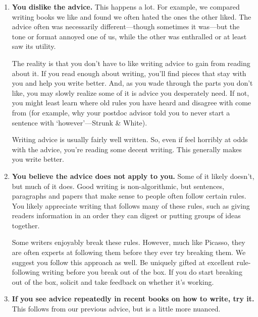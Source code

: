 \documentclass[11pt,letter]{article}
\begin{document}
\begin{enumerate}
\item {\bf You dislike the advice.} This happens a lot. For example, we compared writing books we like and found we often hated the ones the other liked. The advice often was necessarily different---though sometimes it was---but the tone or format annoyed one of us, while the other was enthralled or at least saw its utility. 

The reality is that you don't have to like writing advice to gain from reading about it. If you read enough about writing, you'll find pieces that stay with you and help you write better. And, as you wade through the parts you don't like, you may slowly realize some of it is advice you desperately need. If not, you might least learn where old rules you have heard and disagree with come from (for example, why your postdoc advisor told you to never start a sentence with `however'---Strunk \& White). 

Writing advice is usually fairly well written. So, even if feel horribly at odds with the advice, you're reading some decent writing. This generally makes you write better. 
\item {\bf You believe the advice does not apply to you.} Some of it likely doesn't, but much of it does. Good writing is non-algorithmic, but sentences, paragraphs and papers that make sense to people often follow certain rules. You likely appreciate writing that follows many of these rules, such as giving readers information in an order they can digest or putting groups of ideas together. 

Some writers enjoyably break these rules. However, much like Picasso, they are often experts at following them before they ever try breaking them. We suggest you follow this approach as well. Be uniquely gifted at excellent rule-following writing before you break out of the box. If you do start breaking out of the box, solicit and take feedback on whether it's working. 
\item {\bf If you see advice repeatedly in recent books on how to write, try it.} This follows from our previous advice, but is a little more nuanced. 


\end{enumerate}
\end{document}
